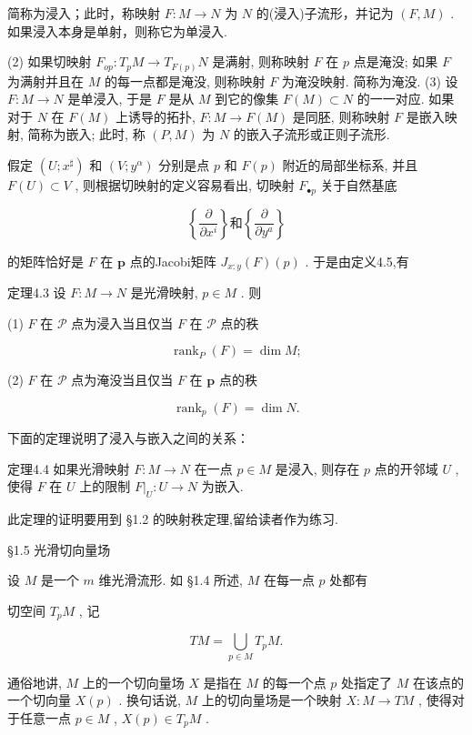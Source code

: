 简称为浸入；此时，称映射  $F:M\to N$  为  $N$  的(浸入)子流形，并记为 $(F,M)$  .如果浸入本身是单射，则称它为单浸入.

(2) 如果切映射  $F_{op}: T_pM \to T_{F(p)}N$  是满射, 则称映射  $F$  在  $p$  点是淹没; 如果  $F$  为满射并且在  $M$  的每一点都是淹没, 则称映射  $F$  为淹没映射. 简称为淹没.  
(3) 设  $F: M \to N$  是单浸入, 于是  $F$  是从  $M$  到它的像集  $F(M) \subset N$  的一一对应. 如果对于  $N$  在  $F(M)$  上诱导的拓扑,  $F: M \to F(M)$  是同胚, 则称映射  $F$  是嵌入映射, 简称为嵌入; 此时, 称  $(P, M)$  为  $N$  的嵌入子流形或正则子流形.

假定  $(U; x^{\sharp})$  和  $(V; y^{\alpha})$  分别是点  $p$  和  $F(p)$  附近的局部坐标系, 并且  $F(U) \subset V$ , 则根据切映射的定义容易看出, 切映射  $F_{\bullet p}$  关于自然基底

$$
\left\{\frac {\partial}{\partial x ^ {i}} \right\} \text {和} \left\{\frac {\partial}{\partial y ^ {a}} \right\}
$$

的矩阵恰好是  $F$  在  $\pmb{p}$  点的Jacobi矩阵  $J_{x:y}(F)(p)$ . 于是由定义4.5,有

定理4.3 设  $F: M \to N$  是光滑映射,  $p \in M$ . 则

(1)  $F$  在  $\mathcal{P}$  点为浸入当且仅当  $F$  在  $\mathcal{P}$  点的秩

$$
\operatorname {r a n k} _ {P} (F) = \dim M;
$$

(2)  $F$  在  $\mathcal{P}$  点为淹没当且仅当  $F$  在  $\pmb{p}$  点的秩

$$
\operatorname {r a n k} _ {p} (F) = \dim N.
$$

下面的定理说明了浸入与嵌入之间的关系：

定理4.4 如果光滑映射  $F: M \to N$  在一点  $p \in M$  是浸入, 则存在  $p$  点的开邻域  $U$ , 使得  $F$  在  $U$  上的限制  $F|_{U}: U \to N$  为嵌入.

此定理的证明要用到 §1.2 的映射秩定理,留给读者作为练习.

 §1.5 光滑切向量场

设  $M$  是一个  $m$  维光滑流形. 如 §1.4 所述,  $M$  在每一点  $p$  处都有

切空间  $T_{p}M$ , 记

$$
T M = \bigcup_ {p \in M} T _ {p} M.
$$

通俗地讲,  $M$  上的一个切向量场  $X$  是指在  $M$  的每一个点  $p$  处指定了  $M$  在该点的一个切向量  $X(p)$ . 换句话说,  $M$  上的切向量场是一个映射  $X: M \to TM$ , 使得对于任意一点  $p \in M$ ,  $X(p) \in T_pM$ .

